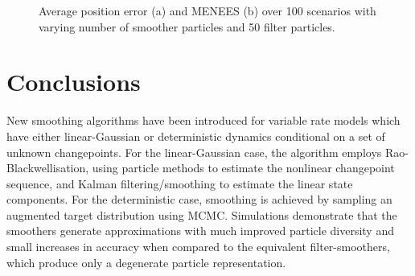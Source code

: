 \documentclass[10pt,twocolumn,twoside]{IEEEtran}
\begin{document}
\begin{figure}[!t]
\centering
{}
\caption{Average position error (a) and MENEES (b) over 100 scenarios with varying number of smoother particles and 50 filter particles.}
\label{fig:varying_num_pts}
\end{figure}


\section{Conclusions}

New smoothing algorithms have been introduced for variable rate models which have either linear-Gaussian or deterministic dynamics conditional on a set of unknown changepoints. For the linear-Gaussian case, the algorithm employs Rao-Blackwellisation, using particle methods to estimate the nonlinear changepoint sequence, and Kalman filtering/smoothing to estimate the linear state components. For the deterministic case, smoothing is achieved by sampling an augmented target distribution using MCMC. Simulations demonstrate that the smoothers generate approximations with much improved particle diversity and small increases in accuracy when compared to the equivalent filter-smoothers, which produce only a degenerate particle representation.
\end{document}
